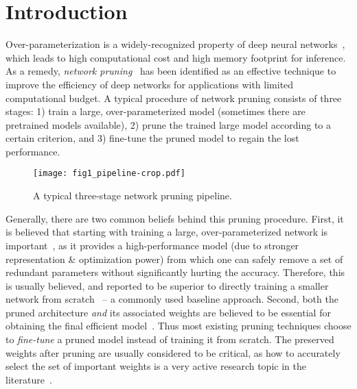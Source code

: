 \section{Introduction}

Over-parameterization is a widely-recognized property of deep neural networks~\cite{lowrank1, deep}, which leads to high computational cost and high memory footprint for inference. As a remedy, \emph{network pruning}~\cite{obd,obs,han2015learning, nvidia, li2016pruning} has been identified as an effective technique to improve the  efficiency of deep networks for applications with limited computational budget. A typical procedure of network pruning consists of three stages: 1) train a large, over-parameterized model (sometimes there are pretrained models available), 2) prune the trained large model according to a certain criterion, and 3) fine-tune the pruned model to regain the lost performance.

\begin{figure}[!htbp]
  \begin{center}
    \texttt{[image: fig1\_pipeline-crop.pdf]}
  \end{center}
\caption{A typical three-stage network pruning pipeline.}
    \label{fig1}
\end{figure}

Generally, there are two common beliefs behind this pruning procedure. First, it is believed that starting with training a large, over-parameterized network is important~\cite{luo2017thinet,carreira2018learning}, as it provides a high-performance model (due to stronger representation \& optimization power) from which one can safely remove a set of redundant parameters without significantly hurting the accuracy. Therefore, this is usually believed, and reported to be superior to directly training a smaller network from scratch~\cite{li2016pruning,luo2017thinet,he2017channel,nisp} -- a commonly used baseline approach.   
Second, both the pruned architecture \emph{and} its associated weights are believed to be essential for obtaining the final efficient model~\cite{han2015learning}. Thus most existing pruning techniques choose to \emph{fine-tune} a pruned model instead of training it from scratch. The preserved weights after pruning are usually considered to be critical, as how to accurately select the set of important weights is a very active research topic in the literature~\cite{nvidia,li2016pruning,luo2017thinet, he2017channel, liu2017learning,pfa}.


